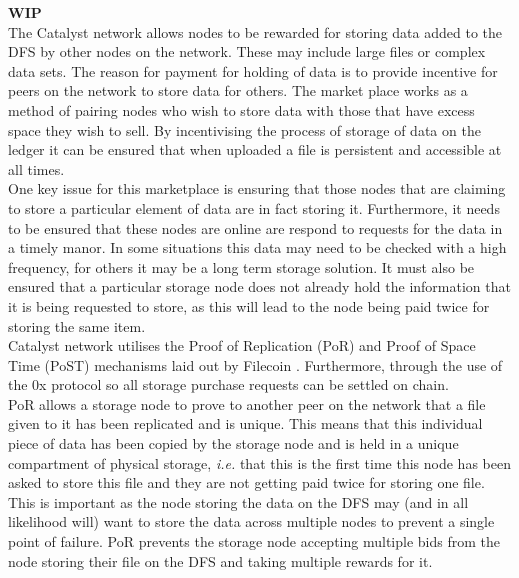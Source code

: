 \textbf{WIP} \\

The Catalyst network allows nodes to be rewarded for storing data added to the DFS by other nodes on the network. These may include large files or complex data sets. The reason for payment for holding of data is to provide incentive for peers on the network to store data for others. The market place works as a method of pairing nodes who wish to store data with those that have excess space they wish to sell. By incentivising the process of storage of data on the ledger it can be ensured that when uploaded a file is persistent and accessible at all times. \\

One key issue for this marketplace is ensuring that those nodes that are claiming to store a particular element of data are in fact storing it. Furthermore, it needs to be ensured that these nodes are online are respond to requests for the data in a timely manor. In some situations this data may need to be checked with a high frequency, for others it may be a long term storage solution. It must also be ensured that a particular storage node does not already hold the information that it is being requested to store, as this will lead to the node being paid twice for storing the same item. \\

Catalyst network utilises the Proof of Replication (PoR) and Proof of Space Time (PoST) mechanisms laid out by Filecoin \cite{benet2018filecoin}. Furthermore, through the use of the 0x protocol \cite{warren20170x} so all storage purchase requests can be settled on chain.  \\

PoR allows a storage node to prove to another peer on the network that a file given to it has been replicated and is unique. This means that this individual piece of data has been copied by the storage node and is held in a unique compartment of physical storage, \textit{i.e.} that this is the first time this node has been asked to store this file and they are not getting paid twice for storing one file. This is important as the node storing the data on the DFS may (and in all likelihood will) want to store the data across multiple nodes to prevent a single point of failure. PoR prevents the storage node accepting multiple bids from the node storing their file on the DFS and taking multiple rewards for it. 
